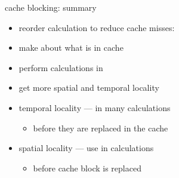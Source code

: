 
\begin{frame}{cache blocking: summary}
\begin{itemize}
\item reorder calculation to reduce cache misses:
\item make  about what is in cache
\item perform calculations in 
\item get more spatial and temporal locality
\item temporal locality ---  in many calculations
    \begin{itemize}
    \item before they are replaced in the cache
    \end{itemize}
\item spatial locality --- use  in calculations
    \begin{itemize}
    \item before cache block is replaced
    \end{itemize}
\end{itemize}
\end{frame}
